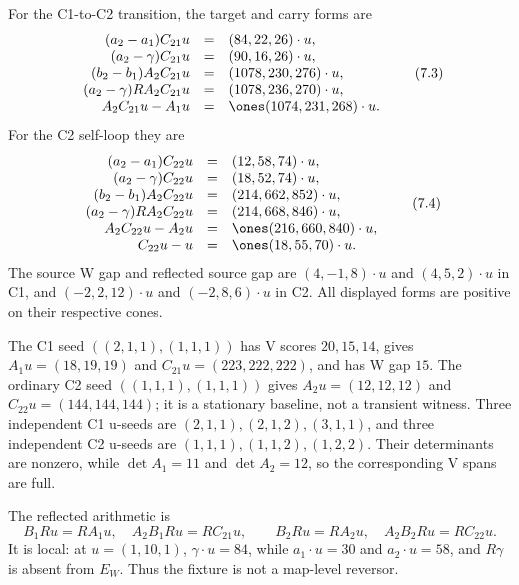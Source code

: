 \documentclass[11pt]{article}
\theoremstyle{definition}
\theoremstyle{remark}
\begin{document}
For the C1-to-C2 transition, the target and carry forms are
\[
\begin{array}{rcl}
(a_2-a_1)C_{21}u&=&(84,22,26)\cdot u,\\
(a_2-\gamma)C_{21}u&=&(90,16,26)\cdot u,\\
(b_2-b_1)A_2C_{21}u&=&(1078,230,276)\cdot u,\\
(a_2-\gamma)RA_2C_{21}u&=&(1078,236,270)\cdot u,\\
A_2C_{21}u-A_1u&=&\ones(1074,231,268)\cdot u.
\end{array}
\tag{7.3}
\]
For the C2 self-loop they are
\[
\begin{array}{rcl}
(a_2-a_1)C_{22}u&=&(12,58,74)\cdot u,\\
(a_2-\gamma)C_{22}u&=&(18,52,74)\cdot u,\\
(b_2-b_1)A_2C_{22}u&=&(214,662,852)\cdot u,\\
(a_2-\gamma)RA_2C_{22}u&=&(214,668,846)\cdot u,\\
A_2C_{22}u-A_2u&=&\ones(216,660,840)\cdot u,\\
C_{22}u-u&=&\ones(18,55,70)\cdot u.
\end{array}
\tag{7.4}
\]
The source W gap and reflected source gap are $(4,-1,8)\cdot u$ and
$(4,5,2)\cdot u$ in C1, and $(-2,2,12)\cdot u$ and
$(-2,8,6)\cdot u$ in C2.  All displayed forms are positive on their
respective cones.

The C1 seed $((2,1,1),(1,1,1))$ has V scores $20,15,14$, gives
$A_1u=(18,19,19)$ and $C_{21}u=(223,222,222)$, and has W gap $15$.
The ordinary C2 seed $((1,1,1),(1,1,1))$ gives
$A_2u=(12,12,12)$ and $C_{22}u=(144,144,144)$; it is a stationary
baseline, not a transient witness.  Three independent C1 u-seeds are
$(2,1,1),(2,1,2),(3,1,1)$, and three independent C2 u-seeds are
$(1,1,1),(1,1,2),(1,2,2)$.  Their determinants are nonzero, while
$\det A_1=11$ and $\det A_2=12$, so the corresponding V spans are full.

The reflected arithmetic is
\[
 B_1Ru=RA_1u,\quad A_2B_1Ru=RC_{21}u,\qquad
 B_2Ru=RA_2u,\quad A_2B_2Ru=RC_{22}u.
\tag{7.5}
\]
It is local: at $u=(1,10,1)$,
$\gamma\cdot u=84$, while $a_1\cdot u=30$ and $a_2\cdot u=58$, and
$R\gamma$ is absent from $E_W$.  Thus the fixture is not a map-level
reversor.
\end{document}

